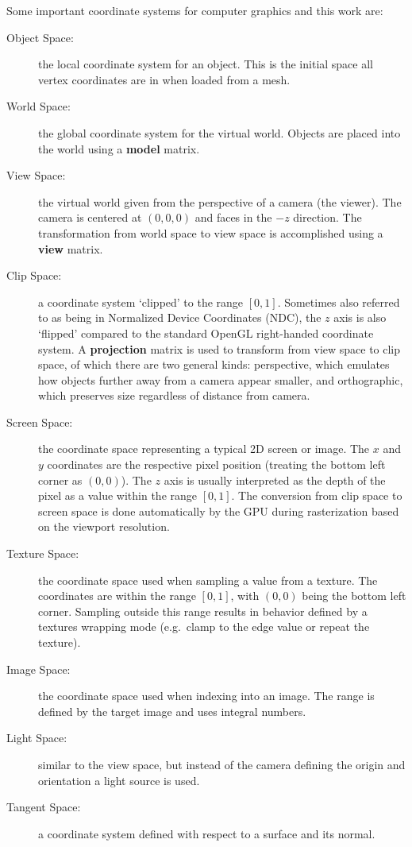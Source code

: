 Some important coordinate systems for computer graphics and this work are:
\begin{description}
    \item[Object Space:] the local coordinate system for an object. This is the initial space all vertex coordinates are in when loaded from a mesh.
    \item[World Space:] the global coordinate system for the virtual world. Objects are placed into the world using a \textbf{model} matrix.
    \item[View Space:] the virtual world given from the perspective of a camera (the viewer). The camera is centered at $(0,0,0)$ and faces in the $-z$ direction. The transformation from world space to view space is accomplished using a \textbf{view} matrix.
    \item[Clip Space:] a coordinate system `clipped' to the range $[0, 1]$. Sometimes also referred to as being in Normalized Device Coordinates (NDC), the $z$ axis is also `flipped' compared to the standard OpenGL right-handed coordinate system. A \textbf{projection} matrix is used to transform from view space to clip space, of which there are two general kinds: perspective, which emulates how objects further away from a camera appear smaller, and orthographic, which preserves size regardless of distance from camera.
    \item[Screen Space:] the coordinate space representing a typical 2D screen or image. The $x$ and $y$ coordinates are the respective pixel position (treating the bottom left corner as $(0,0)$). The $z$ axis is usually interpreted as the depth of the pixel as a value within the range $[0, 1]$. The conversion from clip space to screen space is done automatically by the GPU during rasterization based on the viewport resolution.
    \item[Texture Space:] the coordinate space used when sampling a value from a texture. The coordinates are within the range $[0, 1]$, with $(0, 0)$ being the bottom left corner. Sampling outside this range results in behavior defined by a textures wrapping mode (e.g.\ clamp to the edge value or repeat the texture).
    \item[Image Space:] the coordinate space used when indexing into an image. The range is defined by the target image and uses integral numbers.
    \item[Light Space:] similar to the view space, but instead of the camera defining the origin and orientation a light source is used.
    \item[Tangent Space:] a coordinate system defined with respect to a surface and its normal.
\end{description}

